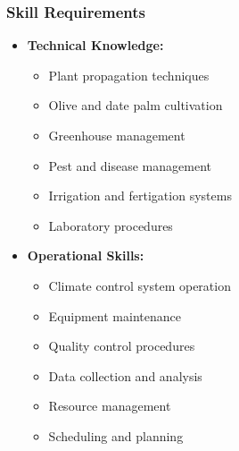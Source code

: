 \subsubsection{Skill Requirements}
\begin{itemize}
    \item \textbf{Technical Knowledge:}
    \begin{itemize}
        \item Plant propagation techniques
        \item Olive and date palm cultivation
        \item Greenhouse management
        \item Pest and disease management
        \item Irrigation and fertigation systems
        \item Laboratory procedures
    \end{itemize}
    
    \item \textbf{Operational Skills:}
    \begin{itemize}
        \item Climate control system operation
        \item Equipment maintenance
        \item Quality control procedures
        \item Data collection and analysis
        \item Resource management
        \item Scheduling and planning
    \end{itemize}
\end{itemize}

